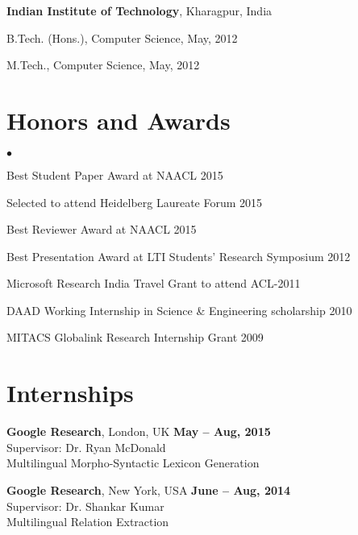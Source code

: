 \documentclass[margin,line]{res}
\newenvironment{list1}{
  \begin{list}{\ding{113}}{%
      \setlength{\itemsep}{0in}
      \setlength{\parsep}{0in} \setlength{\parskip}{0in}
      \setlength{\topsep}{0in} \setlength{\partopsep}{0in}
      \setlength{\leftmargin}{0.17in}}}{\end{list}}
\newenvironment{list2}{
  \begin{list}{$\bullet$}{%
      \setlength{\itemsep}{0in}
      \setlength{\parsep}{0in} \setlength{\parskip}{0in}
      \setlength{\topsep}{0in} \setlength{\partopsep}{0in}
      \setlength{\leftmargin}{0.2in}}}{\end{list}}
\begin{document}
\begin{resume}
{\bf Indian Institute of Technology}, Kharagpur, India\\
\vspace*{-.1in}
\begin{list1}
\item[] B.Tech. (Hons.), Computer Science,  May, 2012
\item[] M.Tech., Computer Science, May, 2012
\end{list1}

\section{\sc Honors and Awards}

\begin{list2}
\item Best Student Paper Award at NAACL 2015
\item Selected to attend Heidelberg Laureate Forum 2015
\item Best Reviewer Award at NAACL 2015
\item Best Presentation Award at LTI Students' Research Symposium 2012
\item Microsoft Research India Travel Grant to attend ACL-2011
\item DAAD Working Internship in Science \& Engineering scholarship 2010
\item MITACS Globalink Research Internship Grant 2009
\end{list2}

\section{\sc Internships}

{\bf Google Research}, London, UK \hfill {\bf May -- Aug, 2015}\\
Supervisor: Dr. Ryan McDonald \\
Multilingual Morpho-Syntactic Lexicon Generation

{\bf Google Research}, New York, USA \hfill {\bf June -- Aug, 2014}\\
Supervisor: Dr. Shankar Kumar \\
Multilingual Relation Extraction


\end{resume}
\end{document}
